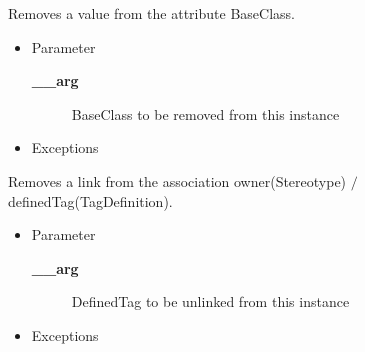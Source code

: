 \begin{desc}Removes a value from the attribute BaseClass.
\begin{itemize}
\item{Parameter
  \begin{description}
   \item[{\bf \_\_arg}]{BaseClass to be removed from this instance}
  \end{description}}
\end{itemize}
\begin{itemize}
\item{{Exceptions}
}
\end{itemize}
\end{desc}

\begin{desc}Removes a link from the association owner(Stereotype)
  $/$ definedTag(TagDefinition).
\begin{itemize}
\item{Parameter
  \begin{description}
   \item[{\bf \_\_arg}]{DefinedTag to be unlinked from this instance}
  \end{description}}
\end{itemize}
\begin{itemize}
\item{{Exceptions}
}
\end{itemize}
\end{desc}

